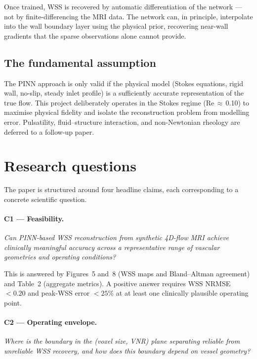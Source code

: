 \documentclass[11pt]{article}
\begin{document}
Once trained, WSS is recovered by automatic differentiation of the network — not by
finite-differencing the MRI data.  The network can, in principle, interpolate into the
wall boundary layer using the physical prior, recovering near-wall gradients that the
sparse observations alone cannot provide.

\subsection*{The fundamental assumption}

The PINN approach is only valid if the physical model (Stokes equations, rigid wall,
no-slip, steady inlet profile) is a sufficiently accurate representation of the true
flow.  This project deliberately operates in the Stokes regime (Re\,$\approx$\,0.10)
to maximise physical fidelity and isolate the reconstruction problem from modelling
error.  Pulsatility, fluid--structure interaction, and non-Newtonian rheology are
deferred to a follow-up paper.

\section{Research questions}

The paper is structured around four headline claims, each corresponding to a concrete
scientific question.

\paragraph{C1 — Feasibility.}
\textit{Can PINN-based WSS reconstruction from synthetic 4D-flow MRI achieve clinically
meaningful accuracy across a representative range of vascular geometries and operating
conditions?}

This is answered by Figures~5 and~8 (WSS maps and Bland--Altman agreement) and
Table~2 (aggregate metrics).  A positive answer requires WSS NRMSE $< 0.20$ and
peak-WSS error $< 25$\% at at least one clinically plausible operating point.

\paragraph{C2 — Operating envelope.}
\textit{Where is the boundary in the (voxel size, VNR) plane separating reliable from
unreliable WSS recovery, and how does this boundary depend on vessel geometry?}
\end{document}
